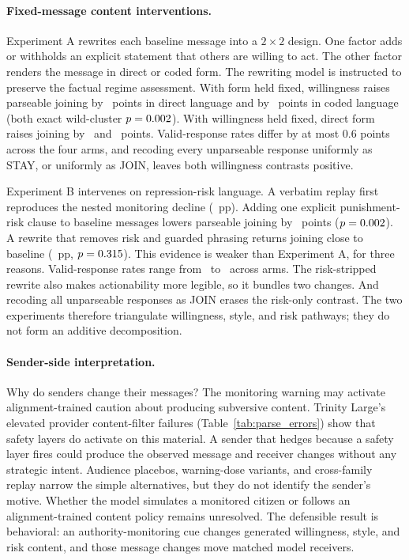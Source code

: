 \documentclass[12pt]{article}
\begin{document}
\paragraph{Fixed-message content interventions.} Experiment A rewrites each baseline message into a $2\times2$ design. One factor adds or withholds an explicit statement that others are willing to act. The other factor renders the message in direct or coded form. The rewriting model is instructed to preserve the factual regime assessment. With form held fixed, willingness raises parseable joining by \ReplayWillingDirectDeltaPP\ points in direct language and by \ReplayWillingCodedDeltaPP\ points in coded language (both exact wild-cluster $p = 0.002$). With willingness held fixed, direct form raises joining by \ReplayDirectWithWillingDeltaPP\ and \ReplayDirectNoWillingDeltaPP\ points. Valid-response rates differ by at most 0.6 points across the four arms, and recoding every unparseable response uniformly as STAY, or uniformly as JOIN, leaves both willingness contrasts positive.

Experiment B intervenes on repression-risk language. A verbatim replay first reproduces the nested monitoring decline (\ReplaySurvDeltaPP~pp). Adding one explicit punishment-risk clause to baseline messages lowers parseable joining by \ReplayRiskOnlyDeltaPP\ points ($p = 0.002$). A rewrite that removes risk and guarded phrasing returns joining close to baseline (\ReplayRiskStrippedVsBaseDeltaPP~pp, $p = 0.315$). This evidence is weaker than Experiment A, for three reasons. Valid-response rates range from \ReplayRiskOnlyValidPct\ to \ReplayBaselineValidPct\ across arms. The risk-stripped rewrite also makes actionability more legible, so it bundles two changes. And recoding all unparseable responses as JOIN erases the risk-only contrast. The two experiments therefore triangulate willingness, style, and risk pathways; they do not form an additive decomposition.



\paragraph{Sender-side interpretation.} Why do senders change their messages? The monitoring warning may activate alignment-trained caution about producing subversive content. Trinity Large's elevated provider content-filter failures (Table~\ref{tab:parse_errors}) show that safety layers do activate on this material. A sender that hedges because a safety layer fires could produce the observed message and receiver changes without any strategic intent. Audience placebos, warning-dose variants, and cross-family replay narrow the simple alternatives, but they do not identify the sender's motive. Whether the model simulates a monitored citizen or follows an alignment-trained content policy remains unresolved. The defensible result is behavioral: an authority-monitoring cue changes generated willingness, style, and risk content, and those message changes move matched model receivers.
\end{document}
